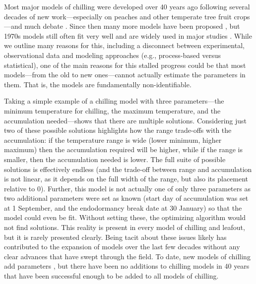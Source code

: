 \documentclass[11pt]{article}
\begin{document}
Most major models of chilling were developed over 40 years ago \citep{richardson1974,chuine2016} following several decades of new work---especially on peaches and other temperate tree fruit crops---and much debate \citep{dormtreeproc}. Since then many more models have been proposed \citep{luedeling2012chilling,chuine2016}, but 1970s models still often fit very well \citep{basler2016evaluating,chuine2016} and are widely used in major studies \citep[e.g.,][]{richardson1974,chuine2016,ospreebbms}. While we outline many reasons for this, including a disconnect between experimental, observational data and modeling approaches (e.g., process-based versus statistical), one of the main reasons for this stalled progress could be that most models---from the old to new ones---cannot actually estimate the parameters in them. That is, the models are fundamentally non-identifiable.

Taking a simple example of a chilling model with three parameters---the minimum temperature for chilling, the maximum temperature, and the accumulation needed---shows that there are multiple solutions. Considering just two of these possible solutions highlights how the range trade-offs with the accumulation: if the temperature range is wide (lower minimum, higher maximum) then the accumulation required will be higher, while if the range is smaller, then the accumulation needed is lower. The full suite of possible solutions is effectively endless (and the trade-off between range and accumulation is not linear, as it depends on the full width of the range, but also its placement relative to 0). Further, this model is not actually one of only three parameters as two additional parameters were set as known (start day of accumulation was set at 1 September, and the endodormancy break date at 30 January) so that the model could even be fit. Without setting these, the optimizing algorithm would not find solutions. This reality is present in every model of chilling and leafout, but it is rarely presented clearly. %
Being tacit about these issues likely has contributed to the expansion of models over the last few decades without any clear advances that have swept through the field. To date, new models of chilling add parameters \citep[e.g.,][]{lued2009}, but there have been no additions to chilling models in 40 years that have been successful enough to be added to all models of chilling. 
\end{document}
